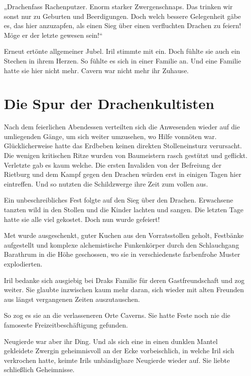 „Drachenfass Rachenputzer. Enorm starker Zwergenschnaps. Das trinken wir sonst nur zu Geburten und Beerdigungen. Doch welch bessere Gelegenheit gäbe es, das hier anzuzapfen, als einen Sieg über einen verfluchten Drachen zu feiern! Möge er der letzte gewesen sein!“

Erneut ertönte allgemeiner Jubel. Iril stimmte mit ein. Doch fühlte sie auch ein Stechen in ihrem Herzen. So fühlte es sich in einer Familie an. Und eine Familie hatte sie hier nicht mehr. Cavern war nicht mehr ihr Zuhause.






\newpage
\section{Die Spur der Drachenkultisten}

Nach dem feierlichen Abendessen verteilten sich die Anwesenden wieder auf die umliegenden Gänge, um sich weiter umzusehen, wo Hilfe vonnöten war. Glücklicherweise hatte das Erdbeben keinen direkten Stolleneinsturz verursacht. Die wenigen kritischen Ritze wurden von Baumeistern rasch gestützt und geflickt. Verletzte gab es kaum welche. Die ersten Invaliden von der Befreiung der Rietburg und dem Kampf gegen den Drachen würden erst in einigen Tagen hier eintreffen. Und so nutzten die Schildzwerge ihre Zeit zum vollen aus.

Ein unbeschreibliches Fest folgte auf den Sieg über den Drachen. Erwachsene tanzten wild in den Stollen und die Kinder lachten und sangen. Die letzten Tage hatte sie alle viel gekostet. Doch nun wurde gefeiert!

Met wurde ausgeschenkt, guter Kuchen aus den Vorratsstollen geholt, Festbänke aufgestellt und komplexe alchemistische Funkenkörper durch den Schlauchgang Barathrum in die Höhe geschossen, wo sie in verschiedenste farbenfrohe Muster explodierten.

Iril bedanke sich ausgiebig bei Draks Familie für deren Gastfreundschaft und zog weiter. Sie glaubte inzwischen kaum mehr daran, sich wieder mit alten Freunden aus längst vergangenen Zeiten auszutauschen.

So zog es sie an die verlasseneren Orte Caverns. Sie hatte Feste noch nie die famoseste Freizeitbeschäftigung gefunden.

Neugierde war aber ihr Ding. Und als sich eine in einen dunklen Mantel gekleidete Zwergin geheimnisvoll an der Ecke vorbeischlich, in welche Iril sich verkrochen hatte, keimte Irils unbändigbare Neugierde wieder auf. Sie liebte schließlich Geheimnisse.

